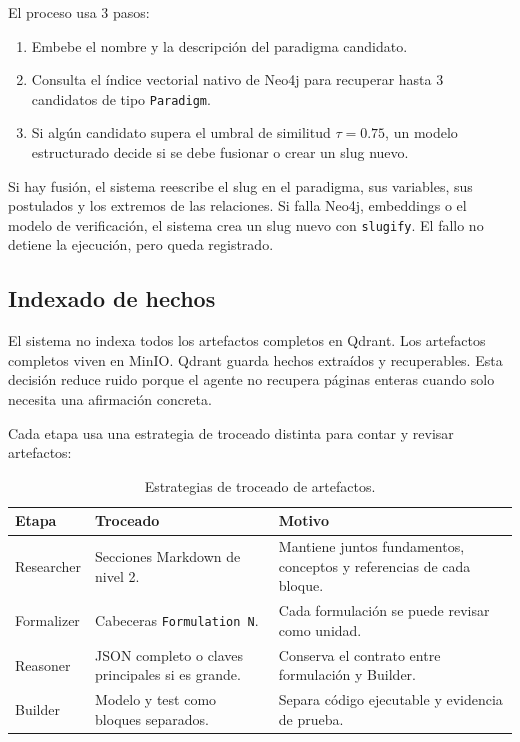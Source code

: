 El proceso usa 3 pasos:

\begin{enumerate}
\item Embebe el nombre y la descripción del paradigma candidato.
\item Consulta el índice vectorial nativo de Neo4j para recuperar hasta 3
candidatos de tipo \texttt{Paradigm}.
\item Si algún candidato supera el umbral de similitud $\tau=0.75$, un modelo
estructurado decide si se debe fusionar o crear un slug nuevo.
\end{enumerate}

Si hay fusión, el sistema reescribe el slug en el paradigma, sus variables, sus
postulados y los extremos de las relaciones. Si falla Neo4j, embeddings o el
modelo de verificación, el sistema crea un slug nuevo con \texttt{slugify}. El
fallo no detiene la ejecución, pero queda registrado.

\subsection{Indexado de hechos}

El sistema no indexa todos los artefactos completos en Qdrant. Los artefactos
completos viven en MinIO. Qdrant guarda hechos extraídos y recuperables. Esta
decisión reduce ruido porque el agente no recupera páginas enteras cuando solo
necesita una afirmación concreta.

Cada etapa usa una estrategia de troceado distinta para contar y revisar
artefactos:

\begin{table}[H]
\begin{center}
\small
\begin{tabular}{|p{2.8cm}|p{4.5cm}|p{5cm}|} \hline
\textbf{Etapa} & \textbf{Troceado} & \textbf{Motivo} \\ \hline
Researcher & Secciones Markdown de nivel 2. & Mantiene juntos fundamentos, conceptos y referencias de cada bloque. \\ \hline
Formalizer & Cabeceras \texttt{Formulation N}. & Cada formulación se puede revisar como unidad. \\ \hline
Reasoner & JSON completo o claves principales si es grande. & Conserva el contrato entre formulación y Builder. \\ \hline
Builder & Modelo y test como bloques separados. & Separa código ejecutable y evidencia de prueba. \\ \hline
\end{tabular}
\caption{Estrategias de troceado de artefactos.}
\end{center}
\end{table}

